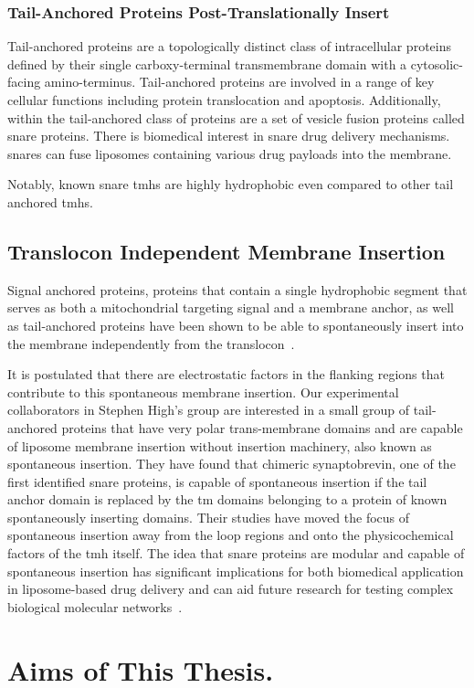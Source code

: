 \subsubsection{Tail-Anchored Proteins Post-Translationally Insert}

Tail-anchored proteins are a topologically distinct class of intracellular proteins defined by their single carboxy-terminal transmembrane domain with a cytosolic-facing amino-terminus. Tail-anchored proteins are involved in a range of key cellular functions including protein translocation and apoptosis. Additionally, within the tail-anchored class of proteins are a set of vesicle fusion proteins called \gls{snare} proteins. There is biomedical interest in \gls{snare} drug delivery mechanisms. \gls{snare}s can fuse liposomes containing various drug payloads into the membrane.

Notably, known \gls{snare} \gls{tmh}s are highly hydrophobic even compared to other tail anchored \gls{tmh}s.

\subsection{Translocon Independent Membrane Insertion}
Signal anchored proteins, proteins that contain a single hydrophobic segment that serves as both a mitochondrial targeting signal and a membrane anchor, as well as tail-anchored proteins have been shown to be able to spontaneously insert into the membrane independently from the translocon~\cite{Elisa2012, Lan2000, Colombo2009}.

It is postulated that there are electrostatic factors in the flanking regions that contribute to this spontaneous membrane insertion. Our experimental collaborators in Stephen High’s group are interested in a small group of tail-anchored proteins that have very polar trans-membrane domains and are capable of liposome membrane insertion without insertion machinery, also known as spontaneous insertion. They have found that chimeric synaptobrevin, one of the first identified \gls{snare} proteins, is capable of spontaneous insertion if the tail anchor domain is replaced by the \gls{tm} domains belonging to a protein of known spontaneously inserting domains. Their studies have moved the focus of spontaneous insertion away from the loop regions and onto the physicochemical factors of the \gls{tmh} itself. The idea that \gls{snare} proteins are modular and capable of spontaneous insertion has significant implications for both biomedical application in liposome-based drug delivery and can aid future research for testing complex biological molecular networks~\cite{Allen2013, Nordlund2014}.


\section{Aims of This Thesis.}
